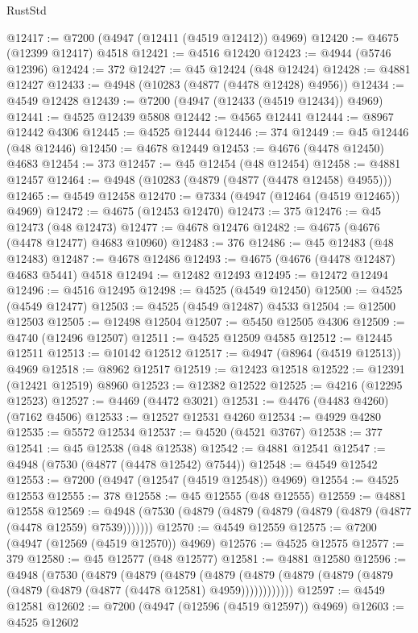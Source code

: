 \begin{lexlean}{RustStd}
\begin{coremodule}
{\begin{coremodule}
{{{{{{{{{{{{{{{{{{{{{{{{{{{{{{{{{{{{{{{{{{{{{{{{{{{{{{{{{{{{@12417 := @7200 (@4947 (@12411 (@4519 @12412)) @4969)
@12420 := @4675 (@12399 @12417) @4518
@12421 := @4516 @12420
@12423 := @4944 (@5746 @12396)
@12424 := 372
@12427 := @45 @12424 (@48 @12424)
@12428 := @4881 @12427
@12433 := @4948 (@10283 (@4877 (@4478 @12428) @4956))
@12434 := @4549 @12428
@12439 := @7200 (@4947 (@12433 (@4519 @12434)) @4969)
@12441 := @4525 @12439 @5808
@12442 := @4565 @12441
@12444 := @8967 @12442 @4306
@12445 := @4525 @12444
@12446 := 374
@12449 := @45 @12446 (@48 @12446)
@12450 := @4678 @12449
@12453 := @4676 (@4478 @12450) @4683
@12454 := 373
@12457 := @45 @12454 (@48 @12454)
@12458 := @4881 @12457
@12464 := @4948 (@10283 (@4879 (@4877 (@4478 @12458) @4955)))
@12465 := @4549 @12458
@12470 := @7334 (@4947 (@12464 (@4519 @12465)) @4969)
@12472 := @4675 (@12453 @12470)
@12473 := 375
@12476 := @45 @12473 (@48 @12473)
@12477 := @4678 @12476
@12482 := @4675 (@4676 (@4478 @12477) @4683 @10960)
@12483 := 376
@12486 := @45 @12483 (@48 @12483)
@12487 := @4678 @12486
@12493 := @4675 (@4676 (@4478 @12487) @4683 @5441) @4518
@12494 := @12482 @12493
@12495 := @12472 @12494
@12496 := @4516 @12495
@12498 := @4525 (@4549 @12450)
@12500 := @4525 (@4549 @12477)
@12503 := @4525 (@4549 @12487) @4533
@12504 := @12500 @12503
@12505 := @12498 @12504
@12507 := @5450 @12505 @4306
@12509 := @4740 (@12496 @12507)
@12511 := @4525 @12509 @4585
@12512 := @12445 @12511
@12513 := @10142 @12512
@12517 := @4947 (@8964 (@4519 @12513)) @4969
@12518 := @8962 @12517
@12519 := @12423 @12518
@12522 := @12391 (@12421 @12519) @8960
@12523 := @12382 @12522
@12525 := @4216 (@12295 @12523)
@12527 := @4469 (@4472 @3021)
@12531 := @4476 (@4483 @4260) (@7162 @4506)
@12533 := @12527 @12531 @4260
@12534 := @4929 @4280
@12535 := @5572 @12534
@12537 := @4520 (@4521 @3767)
@12538 := 377
@12541 := @45 @12538 (@48 @12538)
@12542 := @4881 @12541
@12547 := @4948 (@7530 (@4877 (@4478 @12542) @7544))
@12548 := @4549 @12542
@12553 := @7200 (@4947 (@12547 (@4519 @12548)) @4969)
@12554 := @4525 @12553
@12555 := 378
@12558 := @45 @12555 (@48 @12555)
@12559 := @4881 @12558
@12569 := @4948 (@7530 (@4879 (@4879 (@4879 (@4879 (@4879 (@4877 (@4478 @12559) @7539)))))))
@12570 := @4549 @12559
@12575 := @7200 (@4947 (@12569 (@4519 @12570)) @4969)
@12576 := @4525 @12575
@12577 := 379
@12580 := @45 @12577 (@48 @12577)
@12581 := @4881 @12580
@12596 := @4948
    (@7530
      (@4879
        (@4879
          (@4879
            (@4879 (@4879 (@4879 (@4879 (@4879 (@4879 (@4879 (@4877 (@4478 @12581) @4959))))))))))))
@12597 := @4549 @12581
@12602 := @7200 (@4947 (@12596 (@4519 @12597)) @4969)
@12603 := @4525 @12602
}}}}}}}}}}}}}}}}}}}}}}}}}}}}}}}}}}}}}}}}}}}}}}}}}}}}}}}}}}}}
\end{coremodule}}
\end{coremodule}
\end{lexlean}
